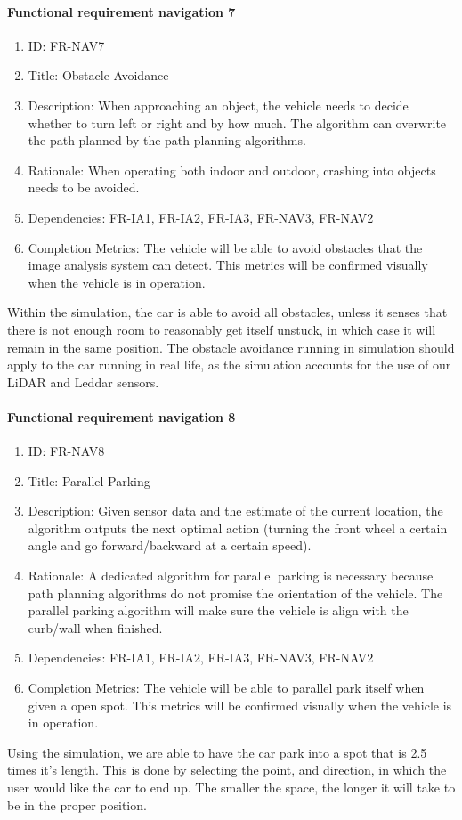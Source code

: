 \documentclass[compsoc,draftclsnofoot,onecolumn,10pt]{IEEEtran}
\begin{document}
	\paragraph{\textbf{Functional requirement navigation 7}}
		\begin{enumerate}
			\item ID: FR-NAV7
			\item Title: Obstacle Avoidance
			\item Description: When approaching an object, the vehicle needs to decide whether to turn left or right and by how much. The algorithm can overwrite the path planned by the path planning algorithms.
			\item Rationale: When operating both indoor and outdoor, crashing into objects needs to be avoided. 
			\item Dependencies: FR-IA1, FR-IA2, FR-IA3, FR-NAV3, FR-NAV2
			\item Completion Metrics: The vehicle will be able to avoid obstacles that the image analysis system can detect. This metrics will be confirmed visually when the vehicle is in operation.  
		\end{enumerate}
    Within the simulation, the car is able to avoid all obstacles, unless it senses that there is not enough room to reasonably get itself unstuck, in which case it will remain in the same position. The obstacle avoidance running in simulation should apply to the car running in real life, as the simulation accounts for the use of our LiDAR and Leddar sensors.
    
	\paragraph{\textbf{Functional requirement navigation 8}}
		\begin{enumerate}
			\item ID: FR-NAV8
			\item Title: Parallel Parking
			\item Description: Given sensor data and the estimate of the current location, the algorithm outputs the next optimal action (turning the front wheel a certain angle and go forward/backward at a certain speed).
			\item Rationale: A dedicated algorithm for parallel parking is necessary because path planning algorithms do not promise the orientation of the vehicle. The parallel parking algorithm will make sure the vehicle is align with the curb/wall when finished.
			\item Dependencies: FR-IA1, FR-IA2, FR-IA3, FR-NAV3, FR-NAV2
			\item Completion Metrics: The vehicle will be able to parallel park itself when given a open spot. 
			This metrics will be confirmed visually when the vehicle is in operation.  
		\end{enumerate}		
	Using the simulation, we are able to have the car park into a spot that is 2.5 times it's length. This is done by selecting the point, and direction, in which the user would like the car to end up. The smaller the space, the longer it will take to be in the proper position. 
	
\end{document}
